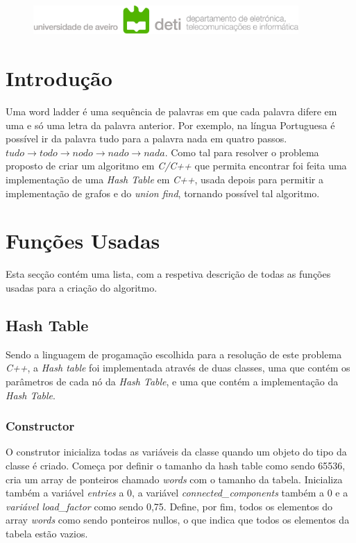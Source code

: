 \documentclass[a4paper,11pt]{article}
\title{}
\author{
    André Cardoso 50\%\\
    andremacardoso@ua.pt\\
    108269\\
    \and
    Tiago Figueiredo 50\%\\
    tiago.a.figueiredo@ua.pt\\
    107263\\
}
\date{09 de Janeiro de 2023}
\begin{document}
    \begin{figure}
        \centering
        \includegraphics[width=0.9\textwidth]{deti2}\label{fig:figure}
    \end{figure}
    \maketitle
    \tableofcontents
    \clearpage


    \section{Introdução}\label{sec:introducao}
Uma word ladder é uma sequência de palavras em que cada palavra difere em uma e só uma letra da palavra anterior.
Por exemplo, na língua Portuguesa é possível ir da palavra tudo para a palavra nada em quatro passos.
\emph{$tudo \rightarrow todo \rightarrow nodo \rightarrow nado \rightarrow nada$}.
Como tal para resolver o problema proposto de criar um algoritmo em \emph{C/C++} que permita encontrar foi feita uma implementação de uma \emph{Hash Table} em \emph{C++}, usada depois para permitir a implementação de grafos e do \emph{union find}, tornando possível tal algoritmo.

    \section{Funções Usadas}\label{sec:funcoes-usadas}
    Esta secção contém uma lista, com a respetiva descrição de todas as funções usadas para a criação do algoritmo.

    \subsection{Hash Table}\label{subsec:hash-table}
    Sendo a linguagem de progamação escolhida para a resolução de este problema \emph{C++}, a \emph{Hash table} foi implementada através de duas classes, uma que contém os parâmetros de cada nó da \emph{Hash Table}, e uma que contém a implementação da \emph{Hash Table}.

    \subsubsection{Constructor}
    O construtor inicializa todas as variáveis da classe quando um objeto do tipo da classe é criado. 
    Começa por definir o tamanho da hash table como sendo 65536, cria um array de ponteiros chamado \emph{words} com o tamanho da tabela. Inicializa também a variável \emph{entries} a 0, a variável \emph{connected\_components} também a 0 e a \emph{variável load\_factor} como sendo 0,75. Define, por fim, todos os elementos do array \emph{words} como sendo ponteiros nullos, o que indica que todos os elementos da tabela estão vazios.
\end{document}
